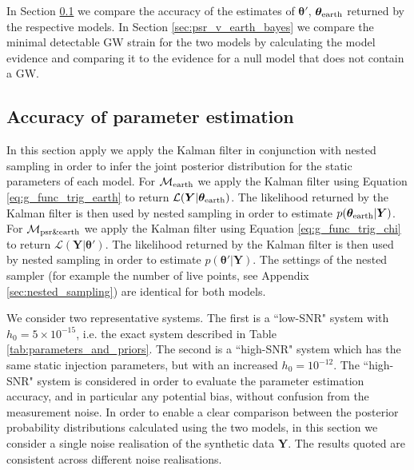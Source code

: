 \documentclass[fleqn,usenatbib,useAMS]{mnras}
\begin{document}
In Section \ref{sec:psr_v_earth_pe} we compare the accuracy of the estimates of $\boldsymbol{\theta'}$, $\boldsymbol{\theta}_{\rm earth}$ returned by the respective models. In Section \ref{sec:psr_v_earth_bayes} we compare the minimal detectable GW strain for the two models by calculating the model evidence and comparing it to the evidence for a null model that does not contain a GW.

\subsection{Accuracy of parameter estimation}\label{sec:psr_v_earth_pe}

In this section apply we apply the Kalman filter in conjunction with nested sampling in order to infer the joint posterior distribution for the static parameters of each model. For $\mathcal{M}_{\rm earth}$ we apply the Kalman filter using Equation \eqref{eq:g_func_trig_earth} to return $\mathcal{L}(\boldsymbol{Y}| \boldsymbol{\theta}_{\rm earth})$. The likelihood returned by the Kalman filter is then used by nested sampling in order to estimate $p(\boldsymbol{\theta}_{\rm earth} | \boldsymbol{Y})$. For $\mathcal{M}_{\rm psr \& earth}$ we apply the Kalman filter using Equation \eqref{eq:g_func_trig_chi} to return $\mathcal{L}(\boldsymbol{Y}| \boldsymbol{\theta}')$. The likelihood returned by the Kalman filter is then used by nested sampling in order to estimate $p(\boldsymbol{\theta'} | \boldsymbol{Y})$. The settings of the nested sampler (for example the number of live points, see Appendix \ref{sec:nested_sampling}) are identical for both models. \newline 

We consider two representative systems. The first is a ``low-SNR" system with $h_0 = 5 \times 10^{-15}$, i.e. the exact system described in Table \ref{tab:parameters_and_priors}. The second is a ``high-SNR" system which has the same static injection parameters, but with an increased $h_0 = 10^{-12}$. The ``high-SNR" system is considered in order to evaluate the parameter estimation accuracy, and in particular any potential bias, without confusion from the measurement noise. In order to enable a clear comparison between the posterior probability distributions calculated using the two models, in this section we consider a single noise realisation of the synthetic data $\boldsymbol{Y}$. The results quoted are consistent across different noise realisations. \newline 
\end{document}
